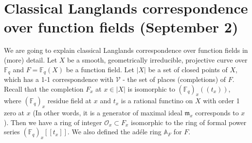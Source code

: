 \newpage
\section{Classical Langlands correspondence over function fields (September 2)}


We are going to explain classical Langlands correspondence over function fields in (more) detail.
Let $X$ be a smooth, geometrically irreducible, projective curve over $\mathbb{F}_{q}$ and $F = \mathbb{F}_{q}(X)$ be a function field.
Let $|X|$ be a set of closed points of $X$, which has a 1-1 correspondence with $\mathscr{V}$ - the set of
places (completions) of $F$.
Recall that the completion $F_{x}$ at $x \in |X|$ is isomorphic to $(\mathbb{F}_{q})_{x}((t_{x}))$, where 
$(\mathbb{F}_{q})_{x}$ residue field at $x$ and $t_{x}$ is a rational functino on $X$ with order 1 zero at $x$
(In other words, it is a generator of maximal ideal $\mathfrak{m}_{x}$ corresponds to $x$).
Then we have a ring of integer $\mathcal{O}_{x} \subset F_{x}$ isomorphic to the ring of
formal power series $(\mathbb{F}_{q})_{x}[[t_{x}]]$.
We also defined the ad\'ele ring $\mathbb{A}_{F}$ for $F$.

